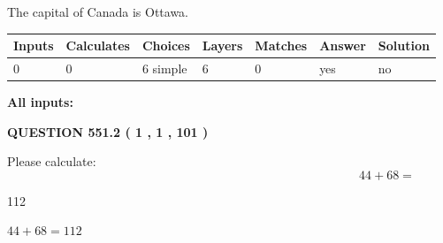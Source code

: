 \documentclass[12pt]{article}
\begin{document}
 
The capital of Canada is Ottawa.
 
 
\noindent{}
 
 
   
   
   
   
\noindent\begin{tabular}{|l|l|l|l|l|l|l|}
 \hline
Inputs & Calculates & Choices & Layers & Matches & Answer & Solution \\ \hline
 0  & 
 0  & 
 6
  simple  
  & 
 6  & 
 0  & 
  yes & 
  no 
  \\ \hline
 \end{tabular}
   
   
   
   
\noindent{}
   
   
   
   
\noindent\vspace{0.1in}\hspace{-0.08in} {\textbf{\Large{All inputs: }}}
   
   
  
\vspace{0.2in}
  
{\textbf{\Large{QUESTION
551.2 
 ( 1 , 1 , 101 )
}}}
  
  
 
Please calculate:
\begin{equation}
44 +  %
68 = \nonumber
\end{equation}
 
 
 
\noindent{}
 
 

112
 
 
\noindent{}
 
 

 
 
 
\noindent{}
 
 

$ %
44 +  %
68=   %
112$
 
 
\noindent{}
 
\end{document}
